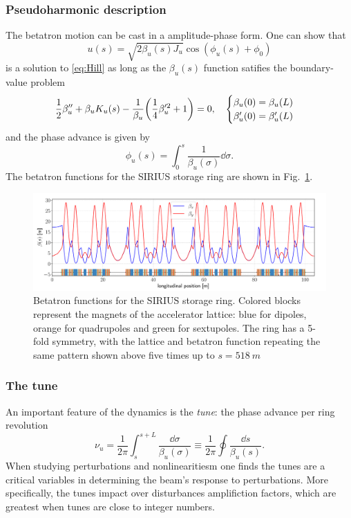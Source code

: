 \subsubsection{Pseudoharmonic description}
The betatron motion can be cast in a amplitude-phase form. One can show that
\begin{equation}
    u(s) = \sqrt{2\beta_u(s) J_u}\cos(\phi_u(s) + \phi_0)
    \label{eq:pseudo_harmon}
\end{equation}
is a solution to \eqref{eq:Hill} as long as the $\beta_u(s)$ function satifies the boundary-value problem
\begin{equation}
    \frac{1}{2}\beta_{u}^{\prime\prime}+\beta_{u} K_u(s) - \frac{1}{\beta_{u}}\qty(\frac{1}{4}\beta_{u}^{\prime 2} + 1 ) = 0, \quad
        \begin{cases}
            \beta_{u}(0) = \beta_{u}(L)\\ \beta_{u}^{\prime}(0) = \beta_{u}^{\prime}(L)
        \end{cases}
    \label{eq:beta_eq}
\end{equation}
and the phase advance is given by
    \begin{equation}
        \phi_u(s) = \int_{0}^{s}\frac{1}{\beta_u(\sigma)}\dd\sigma.
   \end{equation}
The betatron functions for the SIRIUS storage ring are shown in Fig.~\ref{betafunc}.
\begin{figure}[htb]
    \centering
    \includegraphics[width=\textwidth]{Images/beta_functions.pdf}
    \caption{Betatron functions for the SIRIUS storage ring. Colored blocks represent the magnets of the accelerator lattice: blue for dipoles, orange for quadrupoles and green for sextupoles. The ring has a 5-fold symmetry, with the lattice and betatron function repeating the same pattern shown above five times up to $s=518~\unit{m}$}
    \label{betafunc}
\end{figure}
\subsubsection{The tune}
An important feature of the dynamics is the \textit{tune}: the phase advance per ring revolution
\begin{equation*}
    \nu_u=\frac{1}{2\pi}\int_{s}^{s+L}\frac{\dd \sigma}{\beta_u(\sigma)}\equiv\frac{1}{2\pi}\oint\frac{\dd s}{\beta_u(s)}.
\end{equation*}
When studying perturbations and nonlinearitiesm one finds the tunes are a critical variables in determining the beam's response to perturbations. More specifically, the tunes impact over disturbances amplifiction factors, which are greatest when tunes are close to integer numbers.

